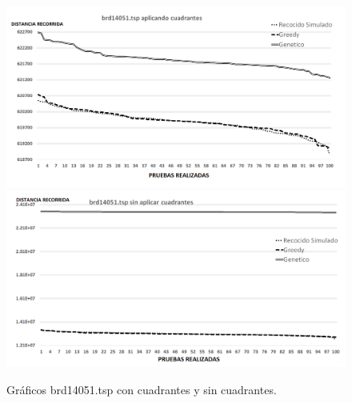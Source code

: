  \begin{figure}[hbtp]
    \centering
        \includegraphics[width=1\textwidth]{PruebasResultados/Experimentos_Graficos_Con/brd14051.png}
        \includegraphics[width=1\textwidth]{PruebasResultados/Experimentos_Graficos_Sin/brd14051.png}
        \caption{Gráficos brd14051.tsp con cuadrantes y sin cuadrantes.}         
        \label{fig:brd14051_grafica.png} 
\end{figure}
\newpage

